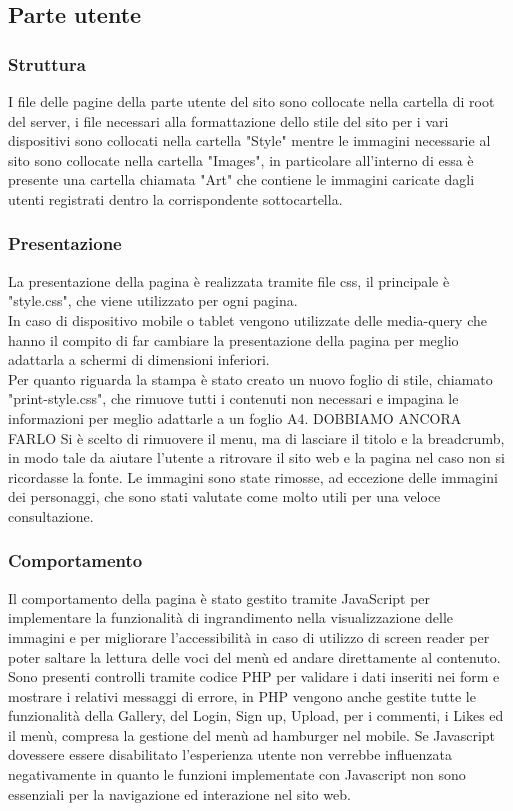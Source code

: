 \documentclass[openany, a4paper, 12pt]{report}
\begin{document}
		\subsection{Parte utente}
			\subsubsection{Struttura}
			I file delle pagine della parte utente del sito sono collocate nella cartella di root del server, i file necessari alla formattazione dello stile del sito per i vari dispositivi sono collocati nella cartella "Style" mentre le immagini necessarie al sito sono collocate nella cartella "Images", in particolare all'interno di essa è presente una cartella chiamata "Art" che contiene le immagini caricate dagli utenti registrati dentro la corrispondente sottocartella.
			\subsubsection{Presentazione}
			La presentazione della pagina è realizzata tramite file css, il principale è "style.css", che viene utilizzato per ogni pagina.\\
			In caso di dispositivo mobile o tablet vengono utilizzate delle media-query che hanno il compito di far cambiare la presentazione della pagina per meglio adattarla a schermi di dimensioni inferiori.\\
			Per quanto riguarda la stampa è stato creato un nuovo foglio di stile, chiamato "print-style.css", che rimuove tutti i contenuti non necessari e impagina le informazioni per meglio adattarle a un foglio A4. 
		DOBBIAMO ANCORA FARLO Si è scelto di rimuovere il menu, ma di lasciare il titolo e la breadcrumb, in modo tale da aiutare l'utente a ritrovare il sito web e la pagina nel caso non si ricordasse la fonte. Le immagini sono state rimosse, ad eccezione delle immagini dei personaggi, che sono stati valutate come molto utili per una veloce consultazione.

			\subsubsection{Comportamento}
			Il comportamento della pagina è stato gestito tramite JavaScript per implementare la funzionalità di ingrandimento nella visualizzazione delle immagini e per migliorare l'accessibilità in caso di utilizzo di screen reader per poter saltare la lettura delle voci del menù ed andare direttamente al contenuto. Sono presenti controlli tramite codice PHP per validare i dati inseriti nei form e mostrare i relativi messaggi di errore, in PHP vengono anche gestite tutte le funzionalità della Gallery, del Login, Sign up, Upload, per i commenti, i Likes ed il menù, compresa la gestione del menù ad hamburger nel mobile. Se Javascript dovessere essere disabilitato l'esperienza utente non verrebbe influenzata negativamente in quanto le funzioni implementate con Javascript non sono essenziali per la navigazione ed interazione nel sito web.
\end{document}

